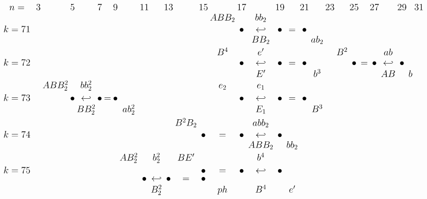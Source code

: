 \documentclass{article}
\begin{document}
\(
\begin{tikzcd}[
nodes={font=\Large,inner sep=0pt},
row sep=0.2cm,
column sep=0.1cm
]
n=& && 3 & & 5 & & 7 & & 9 & & 11 & & 13 & & 15 & & 17 & & 19 & & 21 & & 23 && 25 && 27 && 29 && 31\\
&& && && && && && && && ABB_2 && bb_2 \\
k=71& && && && && && && && && \bullet & \hookleftarrow & \bullet &=& \bullet && \\
&& && && && && && && && && BB_2 && && ab_2 \\
&& && && && && && && && B^4 && e' && && && B^2 && && ab \\
k=72& && && && && && && && && \bullet & \hookleftarrow & \bullet &=& \bullet && && \bullet &=& \bullet &\hookleftarrow& \bullet && \\
&& && && && && && && && && E' && && b^3 && && && AB && b \\
&& && ABB_2^2 && bb_2^2 && && && && && e_2 && e_1 && && && && && \\
k=73& && && \bullet & \hookleftarrow & \bullet &=& \bullet && && && && \bullet & \hookleftarrow & \bullet &=& \bullet && \\
&& && && BB_2^2 && && ab_2^2 && && && && E_1 && && B^3 \\
&& && && && && && && B^2B_2 && && abb_2 \\
k=74& && && && && && && && \bullet &=& \bullet & \hookleftarrow & \bullet && && \\
&& && && && && && && && && ABB_2 && bb_2 \\
&& && && && && AB_2^2 && b_2^2 && BE' && && b^4 && \\
k=75& && && && && && && && \bullet &=& \bullet & \hookleftarrow & \bullet && && \\
& && && && && && \bullet & \hookleftarrow & \bullet &=& \bullet && \\
&& && && && && && B_2^2 && && ph && B^4 && e' \\
\end{tikzcd}
\)
\end{document}
